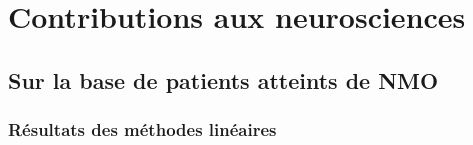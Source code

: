 
\chapter{Contributions aux neurosciences}
\label{Chapter11}





\section{Sur la base de patients atteints de NMO}

\subsection{Résultats des méthodes linéaires}



% 
% 


